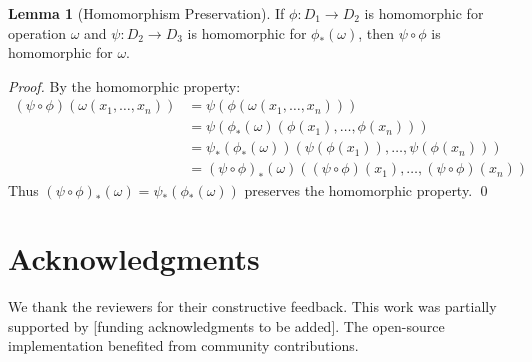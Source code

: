 \documentclass[11pt]{article}
\theoremstyle{definition}
\newtheorem{lemma}{Lemma}
\begin{document}
\begin{lemma}[Homomorphism Preservation]
If $\phi: D_1 \to D_2$ is homomorphic for operation $\omega$ and $\psi: D_2 \to D_3$ is homomorphic for $\phi_*(\omega)$, then $\psi \circ \phi$ is homomorphic for $\omega$.
\end{lemma}

\begin{proof}
By the homomorphic property:
\begin{align}
(\psi \circ \phi)(\omega(x_1, \ldots, x_n)) &= \psi(\phi(\omega(x_1, \ldots, x_n))) \\
&= \psi(\phi_*(\omega)(\phi(x_1), \ldots, \phi(x_n))) \\
&= \psi_*(\phi_*(\omega))(\psi(\phi(x_1)), \ldots, \psi(\phi(x_n))) \\
&= (\psi \circ \phi)_*(\omega)((\psi \circ \phi)(x_1), \ldots, (\psi \circ \phi)(x_n))
\end{align}
Thus $(\psi \circ \phi)_*(\omega) = \psi_*(\phi_*(\omega))$ preserves the homomorphic property. \qed
\end{proof}

\section*{Acknowledgments}

We thank the reviewers for their constructive feedback. This work was partially supported by [funding acknowledgments to be added]. The open-source implementation benefited from community contributions.

\end{document}
